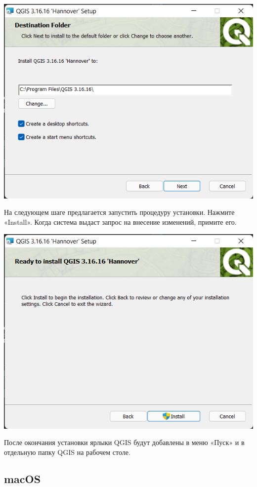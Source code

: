 \documentclass[
  12pt,
]{book}
\begin{document}
\includegraphics{images/Index0/win03.png}

На следующем шаге предлагается запустить процедуру установки. Нажмите «Install». Когда система выдаст запрос на внесение изменений, примите его.

\includegraphics{images/Index0/win04.png}

После окончания установки ярлыки QGIS будут добавлены в меню «Пуск» и в отдельную папку QGIS на рабочем столе.

\hypertarget{macos}{%
\subsection*{macOS}\label{macos}}
\end{document}
